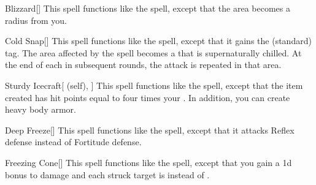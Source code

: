 \lowercase{\hypertarget{spell:Blizzard}{}}\label{spell:Blizzard}
\begin{apability}[\nth{2}]{\hypertarget{spell:Blizzard}{Blizzard}}[]
This spell functions like the  spell, except that the area becomes a \areamed radius from you.
\end{apability}
\vspace{0.25em}



\lowercase{\hypertarget{spell:Cold Snap}{}}\label{spell:Cold Snap}
\begin{apability}[\nth{2}]{\hypertarget{spell:Cold Snap}{Cold Snap}}[]
This spell functions like the  spell, except that it gains the  (standard) tag.
The area affected by the spell becomes a  that is supernaturally chilled.
At the end of each  in subsequent rounds, the attack is repeated in that area.
\end{apability}
\vspace{0.25em}



\lowercase{\hypertarget{spell:Sturdy Icecraft}{}}\label{spell:Sturdy Icecraft}
\begin{attuneability}[\nth{2}]{\hypertarget{spell:Sturdy Icecraft}{Sturdy Icecraft}}[ (self), ]
This spell functions like the  spell, except that the item created has hit points equal to four times your .
In addition, you can create heavy body armor.
\end{attuneability}
\vspace{0.25em}



\lowercase{\hypertarget{spell:Deep Freeze}{}}\label{spell:Deep Freeze}
\begin{apability}[\nth{3}]{\hypertarget{spell:Deep Freeze}{Deep Freeze}}[]
This spell functions like the  spell, except that it attacks Reflex defense instead of Fortitude defense.
\end{apability}
\vspace{0.25em}



\lowercase{\hypertarget{spell:Freezing Cone}{}}\label{spell:Freezing Cone}
\begin{apability}[\nth{3}]{\hypertarget{spell:Freezing Cone}{Freezing Cone}}[]
This spell functions like the  spell, except that you gain a \plus1d bonus to damage and each struck target is  instead of .
\end{apability}
\vspace{0.25em}



